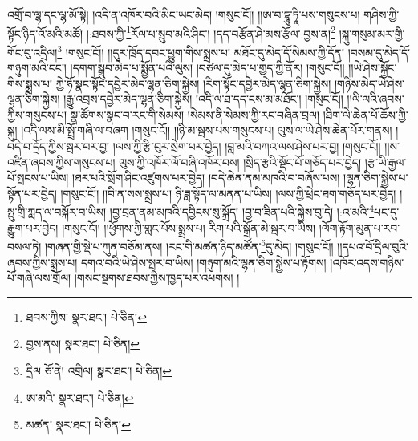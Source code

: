 འགྲོ་བ་ལྷ་དང་ལྷ་མོ་སྟེ། །འདི་ན་འཁོར་བའི་མིང་ཡང་མེད། །གསུང་ངོ།། །།ཨ་བ་དྷཱུ་ཏཱི་པས་གསུངས་པ། གཤིས་ཀྱི་སྟོང་ཉིད་འོ་མའི་མཚོ། །:ཐབས་ཀྱི་\footnote{ཐབས་ཀྱིས་  སྣར་ཐང་།  པེ་ཅིན། }རོལ་པ་སྲུབ་མའི་ཤིང་། །དད་བརྩོན་ཤེ་མས་རྩོལ་:བྱས་ན།\footnote{བྱས་ནས།  སྣར་ཐང་།  པེ་ཅིན། } །སྐུ་གསུམ་མར་གྱི་གོང་བུ་འདྲིལ།\footnote{དྲིལ  ཅོ་ནེ། འགྲིལ།  སྣར་ཐང་།  པེ་ཅིན། } །གསུང་ངོ།། །།དུར་ཁྲོད་དབང་ཕྱུག་གིས་སྨྲས་པ། མཐོང་དུ་མེད་དོ་སེམས་ཀྱི་དོན། །བསམ་དུ་མེད་དོ་གཉུག་མའི་ངང་། །དགག་སྒྲུབ་མེད་པ་སྨྱོན་པའི་ལུས། །བཙལ་དུ་མེད་པ་གྱད་ཀྱི་ནོར། །གསུང་ངོ།། །།ཡེ་ཤེས་སྐྱོང་གིས་སྨྲས་པ། ཀྱེ་ཧོ་སྣང་སྟོང་དབྱེར་མེད་ལྷན་ཅིག་སྐྱེས། །རིག་སྟོང་དབྱེར་མེད་ལྷན་ཅིག་སྐྱེས། །གཉིས་མེད་ཡེ་ཤེས་ལྷན་ཅིག་སྐྱེས། །རྒྱུ་འབྲས་དབྱེར་མེད་ལྷན་ཅིག་སྐྱེས། །འདི་ལ་ཐ་དད་ངས་མ་མཐོང་། །གསུང་ངོ།། །།ལི་ལའི་ཞབས་ཀྱིས་གསུངས་པ། སྣ་ཚོགས་སྣང་བ་རང་གི་སེམས། །སེམས་ནི་སེམས་ཀྱི་རང་བཞིན་བྲལ། །ཐིག་ལེ་ཆེན་པོ་ཆོས་ཀྱི་སྐུ། །འདི་ལས་མི་སྤྲོ་གཞི་ལ་བཞག །གསུང་ངོ།། །།ཉི་མ་སྦས་པས་གསུངས་པ། ལུས་ལ་ཡེ་ཤེས་ཆེན་པོར་གནས། །བདེ་བ་དྲོད་ཀྱིས་སྦར་བར་བྱ། །ལས་ཀྱི་རྩི་བུར་སྲེག་པར་བྱེད། །བླ་མའི་བཀའ་ལས་ཤེས་པར་བྱ། །གསུང་ངོ།། །།ས་འཛིན་ཞབས་ཀྱིས་གསུངས་པ། ལུས་ཀྱི་འཁོར་ལོ་བཞི་འཁོར་བས། །སྲིད་རྩའི་སྡོང་པོ་གཅོད་པར་བྱེད། །རྩ་ཡི་རྒྱལ་པོ་སྤངས་པ་ཡིས། །ཐར་པའི་སྲོག་ཤིང་འཛུགས་པར་བྱེད། །བདེ་ཆེན་ནམ་མཁའི་བ་བཞོས་པས། །ལྷན་ཅིག་སྐྱེས་པ་སྟོན་པར་བྱེད། །གསུང་ངོ།། །།བི་ན་སས་སྨྲས་པ། ཉི་ཟླ་སྟོད་ལ་མནན་པ་ཡིས། །ལས་ཀྱི་ཕྲེང་ཐག་གཅོད་པར་བྱེད། །སྤུ་གྲི་ཀླད་ལ་བསྐོར་བ་ཡིས། །བྱ་བྲན་ནམ་མཁའི་དབྱིངས་སུ་སྐྲོད། །བྱ་བ་ཟིན་པའི་སྐྱེས་བུ་དེ། །:འ་མའི་\footnote{ཨ་མའི་  སྣར་ཐང་།  པེ་ཅིན། }པང་དུ་རྒྱུག་པར་བྱེད། །གསུང་ངོ།། །།ཕྱོགས་ཀྱི་གླང་པོས་སྨྲས་པ། རིག་པའི་སྒྲོན་མེ་སྦར་བ་ཡིས། །ལོག་རྟོག་མུན་པ་རབ་བསལ་ཏེ། །གཞན་གྱི་སྡེ་པ་ཀུན་བཅོམ་ནས། །རང་གི་མཚན་ཉིད་མཚོན་\footnote{མཚན་  སྣར་ཐང་།  པེ་ཅིན། }དུ་མེད། །གསུང་ངོ།། །།དཔའ་བོ་དྲིལ་བུའི་ཞབས་ཀྱིས་སྨྲས་པ། དགའ་བའི་ཡེ་ཤེས་སྤར་བ་ཡིས། །གཉུག་མའི་ལྷན་ཅིག་སྐྱེས་པ་རྟོགས། །འཁོར་འདས་གཉིས་པོ་གཞི་ལས་གྲོལ། །གསང་སྔགས་ཐབས་ཀྱིས་ཁྱད་པར་འཕགས། །
